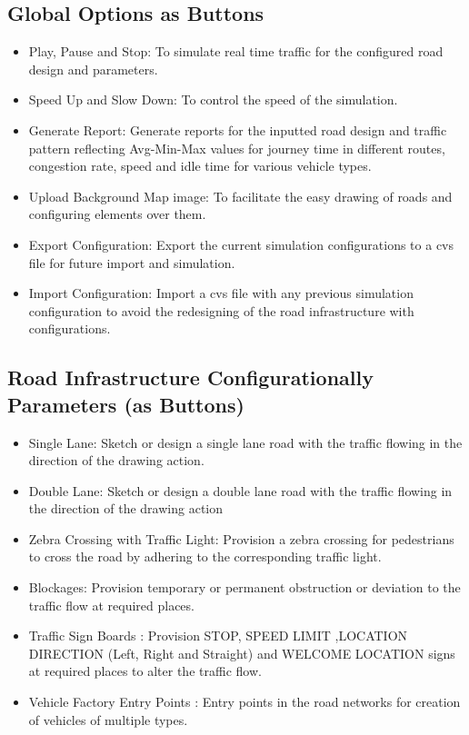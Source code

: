 \documentclass[11pt]{article}
\begin{document}
	\subsection{Global Options as Buttons}
		\begin{itemize}
			\item Play, Pause and Stop: To simulate real time traffic for the configured road design and parameters.
			\item Speed Up and Slow Down: To control the speed of the simulation.
			\item Generate Report: Generate reports for the inputted road design and traffic pattern reflecting Avg-Min-Max values for journey time in different routes, congestion rate, speed and idle time for various vehicle types.
			\item Upload Background Map image: To facilitate the easy drawing of roads and configuring elements over them.
			\item Export Configuration: Export the current simulation configurations to a cvs file for future import and simulation.
			\item Import Configuration: Import a cvs file with any previous simulation configuration to avoid the redesigning of the road infrastructure with configurations.
	\end{itemize}

	\subsection{Road Infrastructure Configurationally Parameters (as Buttons)}
		\begin{itemize}
			\item Single Lane: Sketch or design a single lane road with the traffic flowing in the direction of the drawing action.
			\item Double Lane: Sketch or design a double lane road with the traffic flowing in the direction of the drawing action
			\item Zebra Crossing with Traffic Light: Provision a zebra crossing for pedestrians to cross the road by adhering to the corresponding traffic light.
			\item Blockages: Provision temporary or permanent obstruction or deviation to the traffic flow at required places.
			\item Traffic Sign Boards :  Provision STOP, SPEED LIMIT ,LOCATION DIRECTION (Left, Right and Straight) and WELCOME LOCATION signs at required places to alter the traffic flow.
			\item Vehicle Factory Entry Points : Entry points in the road networks for creation of vehicles of multiple types.
	\end{itemize}
\end{document}
